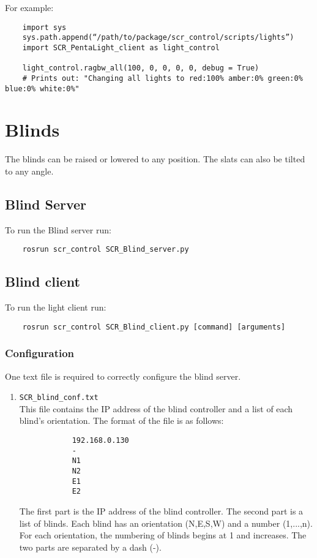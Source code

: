 \documentclass[twoside]{article}
\begin{document}
	
	For example:
	\begin{verbatim}
	import sys
	sys.path.append(“/path/to/package/scr_control/scripts/lights”)
	import SCR_PentaLight_client as light_control
	
	light_control.ragbw_all(100, 0, 0, 0, 0, debug = True) 
	# Prints out: "Changing all lights to red:100% amber:0% green:0% blue:0% white:0%"
	\end{verbatim}
	
	\section{Blinds}
	The blinds can be raised or lowered to any position. The slats can also be tilted to any angle.
	
	\subsection{Blind Server}
	To run the Blind server run:
	\begin{verbatim}
	rosrun scr_control SCR_Blind_server.py
	\end{verbatim}
	
	\subsection{Blind client}
	To run the light client run:
	\begin{verbatim}
	rosrun scr_control SCR_Blind_client.py [command] [arguments]
	\end{verbatim}
	
	\subsubsection{Configuration}
	One text file is required to correctly configure the blind server.
	
	\begin{enumerate}
		\item \verb|SCR_blind_conf.txt|\\
		This file contains the IP address of the blind controller and a list of each blind's orientation. The format of the file is as follows:
		
		\begin{verbatim}
		    192.168.0.130
		    -
		    N1
		    N2
		    E1
		    E2
		\end{verbatim}
		The first part is the IP address of the blind controller. The second part is a list of blinds. Each blind has an orientation (N,E,S,W) and a number (1,...,n). For each orientation, the numbering of blinds begins at 1 and increases. The two parts are separated by a dash (-).
		
	\end{enumerate}
\end{document}
